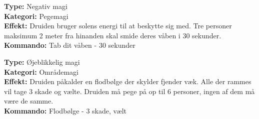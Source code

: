\begin{nkaos*}
\textbf{Type:} Negativ magi\\
\textbf{Kategori:} Pegemagi\\
\textbf{Effekt:} Druiden bruger solens energi til at beskytte sig med. Tre personer maksimum 2 meter fra hinanden skal smide deres våben i 30 sekunder.\\
\textbf{Kommando:} Tab dit våben - 30 sekunder

\end{nkaos*}

\begin{nkaos*}[Flodbølge]
\textbf{Type:} Øjeblikkelig magi\\
\textbf{Kategori:} Områdemagi\\
\textbf{Effekt:} Druiden påkalder en flodbølge der skylder fjender væk. Alle der rammes vil tage 3 skade og vælte. Druiden må pege på op til 6 personer, ingen af dem må være de samme.\\
\textbf{Kommando:} Flodbølge - 3 skade, vælt
\end{nkaos*}
